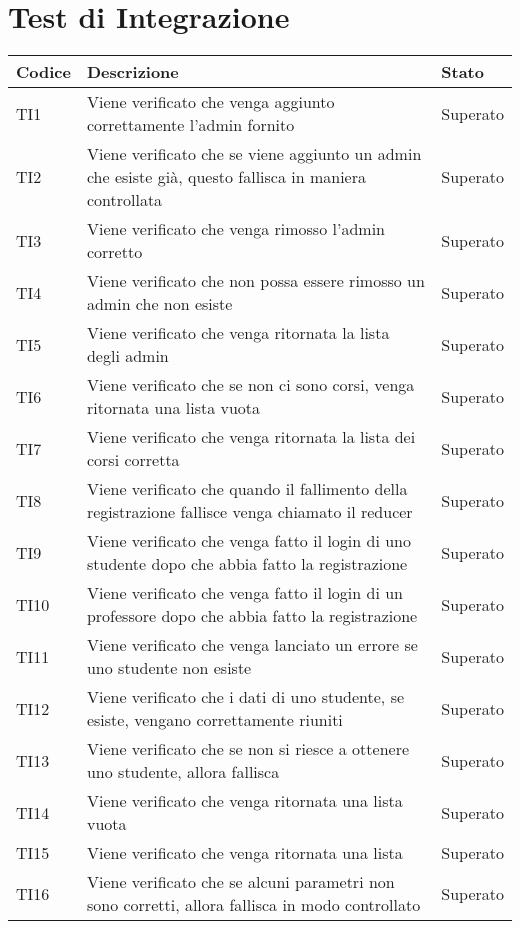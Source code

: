 \documentclass[PianoDiQualifica.tex]{subfiles}
\begin{document}
\chapter{Test di Integrazione}

\begin{longtable}[H]{P{2cm}P{8.5cm}P{3cm}}
	\color{CHeaderText}\textbf{Codice} & 
	\color{CHeaderText}\textbf{Descrizione} & 
	\color{CHeaderText}\textbf{Stato}\\
	\endhead
	TI1 & Viene verificato che venga aggiunto correttamente l'admin fornito & Superato \\ 
	TI2 & Viene verificato che se viene aggiunto un admin che esiste già, questo fallisca in maniera controllata & Superato \\
	TI3 & Viene verificato che venga rimosso l'admin corretto & Superato \\
	TI4 & Viene verificato che non possa essere rimosso un admin che non esiste & Superato \\
	TI5 & Viene verificato che venga ritornata la lista degli admin & Superato \\
	TI6 & Viene verificato che se non ci sono corsi, venga ritornata una lista vuota & Superato \\
	TI7 & Viene verificato che venga ritornata la lista dei corsi corretta & Superato \\
	TI8 & Viene verificato che quando il fallimento della registrazione fallisce venga chiamato il reducer & Superato \\
	TI9 & Viene verificato che venga fatto il login di uno studente dopo che abbia fatto la registrazione & Superato \\
	TI10 & Viene verificato che venga fatto il login di un professore dopo che abbia fatto la registrazione & Superato \\
	TI11 & Viene verificato che venga lanciato un errore se uno studente non esiste & Superato \\
	TI12 & Viene verificato che i dati di uno studente, se esiste, vengano correttamente riuniti & Superato \\
	TI13 & Viene verificato che se non si riesce a ottenere uno studente, allora fallisca & Superato \\
	TI14 & Viene verificato che venga ritornata una lista vuota & Superato \\
	TI15 & Viene verificato che venga ritornata una lista & Superato \\
	TI16 & Viene verificato che se alcuni parametri non sono corretti, allora fallisca in modo controllato & Superato \\

\end{longtable}
\end{document}
